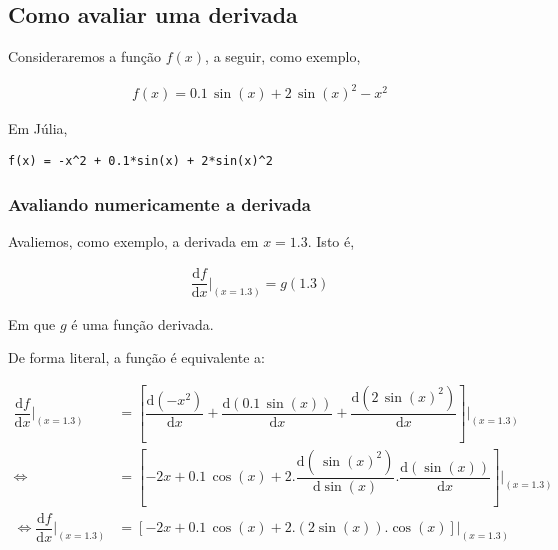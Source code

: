 \documentclass[12pt]{article}
\begin{document}
\subsection{Como avaliar uma derivada}
\label{sec:orgb283cdb}
Consideraremos a função \(f(x)\), a seguir, como exemplo,

\begin{equation}
\begin{aligned}
f(x) = 0.1 \, \sin(x) + 2\,\sin(x)^2 - x^2 
\end{aligned}
\end{equation}

Em Júlia,
\begin{verbatim}
f(x) = -x^2 + 0.1*sin(x) + 2*sin(x)^2
\end{verbatim}


\subsubsection{Avaliando \textbf{numericamente} a derivada}
\label{sec:orgd43ace4}
Avaliemos, como exemplo, a derivada em \(x=1.3\). Isto é,

\begin{equation}
\begin{aligned}
\dfrac{\text{d}f}{\text{d}x}\biggr\rvert_{(x=1.3)} = g(1.3)
\end{aligned}
\end{equation}

Em que \(g\) é uma função derivada.

De forma literal, a função é equivalente a:

\begin{equation}
\begin{aligned}
\dfrac{\text{d}f}{\text{d}x}\biggr\rvert_{(x=1.3)} &= \left[\dfrac{\text{d}(-x^2)}{\text{d}x} +  \dfrac{\text{d}(0.1 \, \sin(x))}{\text{d}x} + \dfrac{\text{d}(2\,\sin(x)^2)}{\text{d}x}  \right]\biggr\rvert_{(x=1.3)} \\
\Leftrightarrow  &=  \left[-2x +  0.1 \, \cos(x) + 2.\dfrac{\text{d}(\,\sin(x)^2)}{\text{d}\sin(x)}.\dfrac{\text{d}(\sin(x))}{\text{d}x}  \right]\biggr\rvert_{(x=1.3)}\\
\Leftrightarrow  \dfrac{\text{d}f}{\text{d}x}\biggr\rvert_{(x=1.3)}&= \left[-2x +  0.1 \, \cos(x) + 2.(2\sin(x)).\cos(x)  \right]\biggr\rvert_{(x=1.3)}\\
\end{aligned}
\end{equation}
\end{document}
